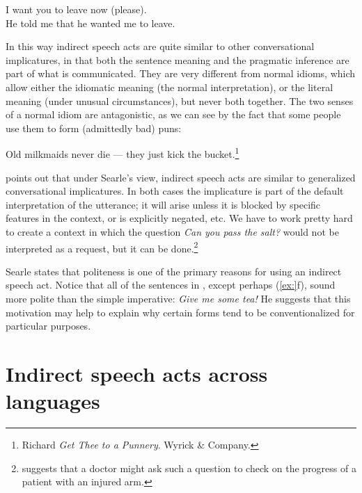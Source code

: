 \ea
\ea I want you to leave now (please).\\
\ex He told me that he wanted me to leave.
                       \z
\z


In this way indirect speech acts are quite similar to other conversational implicatures, in that both the sentence meaning and the pragmatic inference are part of what is communicated. They are very different from normal idioms, which allow either the idiomatic meaning (the normal interpretation), or the literal meaning (under unusual circumstances), but never both together. The two senses of a normal idiom are antagonistic, as we can see by the fact that some people use them to form (admittedly bad) puns:


\ea






  Old milkmaids never die — they just kick the bucket.\footnote{Richard \citet{Lederer1988} \textit{Get Thee to a Punnery}. Wyrick \& Company.}
\z


\citet[196]{Birner2012} points out that under Searle’s view, indirect speech acts are similar to generalized conversational implicatures. In both cases the implicature is part of the default interpretation of the utterance; it will arise unless it is blocked by specific features in the context, or is explicitly negated, etc. We have to work pretty hard to create a context in which the question \textit{Can you pass the salt?} would not be interpreted as a request, but it can be done.\footnote{\citet[69]{Searle1975} suggests that a doctor might ask such a question to check on the progress of a patient with an injured arm.}



Searle states that politeness is one of the primary reasons for using an indirect speech act. Notice that all of the sentences in , except perhaps (\ref{ex:}f), sound more polite than the simple imperative: \textit{Give me some tea!} He suggests that this motivation may help to explain why certain forms tend to be conventionalized for particular purposes.



\section{Indirect speech acts across languages}\label{sec:} %

